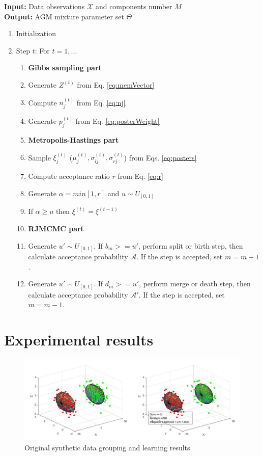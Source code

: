 \documentclass[conference]{IEEEtran}
\begin{document}
\noindent\textbf{Input:} Data observations $\mathcal{X}$ and components number $M$ \\
\textbf{Output:} AGM mixture parameter set $\Theta$
\begin{enumerate}
\item Initialization
\item Step $t$: For $t = 1,\ldots$
\begin{enumerate}
\item[]\textbf{Gibbs sampling part}
\item Generate $Z^{(t)}$ from Eq. \eqref{eq:memVector}
\item Compute $n_j^{(t)}$ from Eq. \eqref{eq:nj}
\item Generate $p_j^{(t)}$ from Eq. \eqref{eq:posterWeight}
\item[] \textbf{Metropolis-Hastings part}
\item Sample $\xi_j^{(t)}$ ($\mu_j^{(t)}, \sigma_{lj}^{(t)}, \sigma_{rj}^{(t)}$) from Eqs. \eqref{eq:posters}
\item Compute acceptance ratio $r$ from Eq. \eqref{eq:r}
\item Generate $\alpha = min[1,r]$ and $u \sim U_{[0,1]}$
\item If $\alpha \geq u$ then $\xi^{(t)} = \xi^{(t-1)}$
\item[] \textbf{RJMCMC part}
\item Generate $u' \sim U_{[0,1]}$. If $b_m>=u'$, perform split or birth step, then calculate acceptance probability $\mathcal{A}$. If the step is accepted, set $m=m+1$.
\item Generate $u' \sim U_{[0,1]}$. If $d_m>=u'$, perform merge or death step, then calculate acceptance probability $\mathcal{A}'$. If the step is accepted, set $m=m-1$.
\end{enumerate}
\end{enumerate}

\section{Experimental results}
\begin{figure}[b]
\centering
\includegraphics[width=0.45\paperwidth]{syn.jpg}
\caption{Original synthetic data grouping and learning results}
\label{fig:1}
\end{figure}
\end{document}
